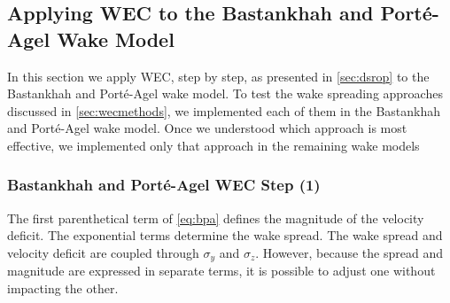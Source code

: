 \documentclass[a4paper]{jpconf}
\begin{document}
\subsection{Applying WEC to the Bastankhah and Port\'e-Agel Wake Model}

In this section we apply WEC, step by step, as presented in \cref{sec:dsrop} to the Bastankhah and Port\'e-Agel wake model. To test the wake spreading approaches discussed in \cref{sec:wecmethods}, we implemented each of them in the Bastankhah and Port\'{e}-Agel wake model. Once we understood which approach is most effective, we implemented only that approach in the remaining wake models

\subsubsection{Bastankhah and Port\'e-Agel WEC Step (1)}
The first parenthetical term of \cref{eq:bpa} defines the magnitude of the velocity deficit. The exponential terms determine the wake spread. The wake spread and velocity deficit are coupled through $\sigma_y$ and $\sigma_z$. However, because the spread and magnitude are expressed in separate terms, it is possible to adjust one without impacting the other. 
\end{document}
